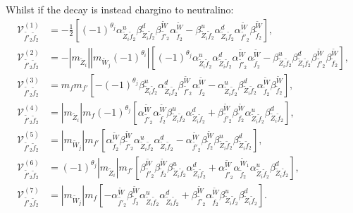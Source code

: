 \documentclass[final,3p,times,pdflatex]{elsarticle}
\begin{document}
Whilst if the decay is instead chargino to neutralino:
\begin{align}
\mathcal{V}_{\tilde{f'}_2 \tilde{f}_2}^{(1)} &=-\frac{1}{2}\left[(-1)^{\theta_j}\alpha_{\tilde{Z}_i \tilde{f}_2}^{u} \beta_{\tilde{Z}_i \tilde{f}_2}^{d} \beta_{\tilde{f'}_2}^{\tilde{W}}\alpha_{\tilde{f}_2}^{\tilde{W}} - \beta_{\tilde{Z}_i \tilde{f}_2}^{u} \alpha_{\tilde{Z}_i \tilde{f}_2}^{d} \alpha_{\tilde{f'}_2}^{\tilde{W}} \beta_{\tilde{f}_2}^{\tilde{W}}\right], \\
\mathcal{V}_{\tilde{f'}_2 \tilde{f}_2}^{(2)} &= -|m_{\tilde{Z}_i}||m_{\tilde{W}_j}(-1)^{\theta_i}|\left[(-1)^{\theta_j} \alpha_{\tilde{Z}_i \tilde{f}_2}^{u} \alpha_{\tilde{Z}_i \tilde{f}_2}^{d} \alpha_{\tilde{f'}_2}^{\tilde{W}} \alpha_{\tilde{f}_2}^{\tilde{W}} - \beta_{\tilde{Z}_i \tilde{f}_2}^{u} \beta_{\tilde{Z}_{i} \tilde{f}_2}^{d} \beta_{\tilde{f'}_2}^{\tilde{W}} \beta_{\tilde{f}_2}^{\tilde{W}}\right], \\
\mathcal{V}_{\tilde{f'}_2 \tilde{f}_2}^{(3)} &= m_{f}m_{f'}\left[-(-1)^{\theta_j}\beta_{\tilde{Z}_i \tilde{f}_2}^{u} \alpha_{\tilde{Z}_i \tilde{f}_2}^{d} \beta_{\tilde{f'}_2}^{\tilde{W}} \alpha_{\tilde{f}_2}^{\tilde{W}} -  \alpha_{\tilde{Z}_i \tilde{f}_2}^{u} \beta_{\tilde{Z}_i \tilde{f}_2}^{d} \alpha_{\tilde{f}_2}^{\tilde{W}} \beta_{\tilde{f}_2}^{\tilde{W}}\right], \\
\mathcal{V}_{\tilde{f'}_2 \tilde{f}_2}^{(4)} &= |m_{\tilde{Z}_i}| m_{f} (-1)^{\theta_j} \left[\alpha_{\tilde{f'}_2}^{\tilde{W}} \alpha_{\tilde{f}_2}^{\tilde{W}} \beta_{\tilde{Z}_i \tilde{f}_2}^{u} \alpha_{\tilde{Z}_i \tilde{f}_2}^{d} + \beta_{\tilde{f'}_2}^{\tilde{W}} \beta_{\tilde{f}_2}^{\tilde{W}} \alpha_{\tilde{Z}_i \tilde{f}_2}^{u} \beta_{\tilde{Z}_i \tilde{f}_2}^{d}\right] ,\\
\mathcal{V}_{\tilde{f'}_2 \tilde{f}_2}^{(5)} &= |m_{\tilde{W}_j}|m_{f'} \left[\alpha_{\tilde{f}_2}^{\tilde{W}} \beta_{\tilde{f'}_2}^{\tilde{W}} \alpha_{\tilde{Z}_i \tilde{f}_2}^{u} \alpha_{\tilde{Z}_i \tilde{f}_2}^{d} - \alpha_{\tilde{f'}_2}^{\tilde{W}} \beta_{\tilde{f}_2}^{\tilde{W}} \beta_{\tilde{Z}_i \tilde{f}_2}^{u} \beta_{\tilde{Z}_i \tilde{f}_2}^{d}\right],\\
\mathcal{V}_{\tilde{f'}_2 \tilde{f}_2}^{(6)} &= (-1)^{\theta_j}|m_{\tilde{Z}_i}| m_{f'}\left[\beta_{\tilde{f'}_2}^{\tilde{W}}\beta_{\tilde{f}_2}^{\tilde{W}} \beta_{\tilde{Z}_i \tilde{f}_2}^{u} \alpha_{\tilde{Z}_i \tilde{f}_2}^{d}  + \alpha_{\tilde{f'}_2}^{\tilde{W}} \alpha_{\tilde{f}_2}^{\tilde{W}_1} \alpha_{\tilde{Z}_i \tilde{f}_2}^{u} \beta_{\tilde{Z}_i \tilde{f}_2}^{d}\right], \\
\mathcal{V}_{\tilde{f'}_2 \tilde{f}_2}^{(7)} &= |m_{\tilde{W}_j}|m_{f}\left[-\alpha_{\tilde{f'}_2}^{\tilde{W}}\beta_{\tilde{f}_2}^{\tilde{W}} \alpha_{\tilde{Z}_i \tilde{f}_2}^{u} \alpha_{\tilde{Z}_i \tilde{f}_2}^{d} + \beta_{\tilde{f'}_2}^{\tilde{W}} \alpha_{\tilde{f}_2}^{\tilde{W}} \beta_{\tilde{Z}_i \tilde{f}_2}^{u} \beta_{\tilde{Z}_i \tilde{f}_2}^{d}\right].
\end{align}
\end{document}
